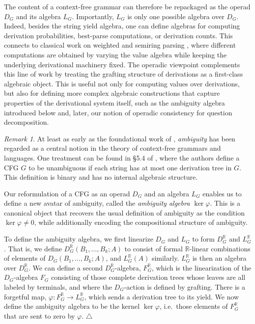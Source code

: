 \documentclass{article}
\theoremstyle{plain}
\theoremstyle{definition}
\theoremstyle{remark}
\newtheorem{remark}[theorem]{Remark}
\theoremstyle{definition}
\newcommand{\bR}{\mathbb{R}}
\begin{document}
The content of a context-free grammar can therefore be repackaged as the operad $D_G$ and its algebra $L_G$.
Importantly, $L_G$ is only one possible algebra over $D_G$.
Indeed, besides the string yield algebra, one can define algebras for computing derivation probabilities, best-parse computations, or derivation counts.
This connects to classical work on weighted and semiring parsing \citep{goodman1999semiring, nederhof2003weighted}, where different computations are obtained by varying the value algebra while keeping the underlying derivational machinery fixed.
The operadic viewpoint complements this line of work by treating the grafting structure of derivations as a first-class algebraic object.
This is useful not only for computing values over derivations, but also for defining more complex algebraic constructions that capture properties of the derivational system itself, such as the ambiguity algebra introduced below and, later, our notion of operadic consistency for question decomposition.

\begin{remark}
\label{rmk:cfg_ambiguity}
At least as early as the foundational work of \citet{chomsky_schuetzenberger}, \emph{ambiguity} has been regarded as a central notion in the theory of context-free grammars and languages.
One treatment can be found in \S5.4 of \citet{hopcroft_motwani_ullman:introduction_to_automata}, where the authors define a CFG $G$ to be unambiguous if each string has at most one derivation tree in $G$.
This definition is binary and has no internal algebraic structure.

Our reformulation of a CFG as an operad $D_G$ and an algebra $L_G$ enables us to define a new avatar of ambiguity, called the \emph{ambiguity algebra $\ker\varphi$}.
This is a canonical object that recovers the usual definition of ambiguity as the condition $\ker\varphi \neq 0$, while additionally encoding the compositional structure of ambiguity.

To define the ambiguity algebra, we first linearize $D_G$ and $L_G$ to form $D_G^\bR$ and $L_G^\bR$.
That is, we define $D_G^\bR(B_1,\ldots,B_k;A)$ to consist of formal $\bR$-linear combinations of elements of $D_G(B_1,\ldots,B_k;A)$, and $L_G^\bR(A)$ similarly.
$L_G^\bR$ is then an algebra over $D_G^\bR$.
We can define a second $D_G^\bR$-algebra, $F_G^\bR$, which is the linearization of the $D_G$-algebra $F_G$ consisting of those complete derivation trees whose leaves are all labeled by terminals, and where the $D_G$-action is defined by grafting.
There is a forgetful map, $\varphi\colon F_G^\bR \to L_G^\bR$, which sends a derivation tree to its yield.
We now define the ambiguity algebra to be the kernel $\ker\varphi$, i.e.\ those elements of $F_G^\bR$ that are sent to zero by $\varphi$.
\null\hfill$\triangle$
\end{remark}
\end{document}
